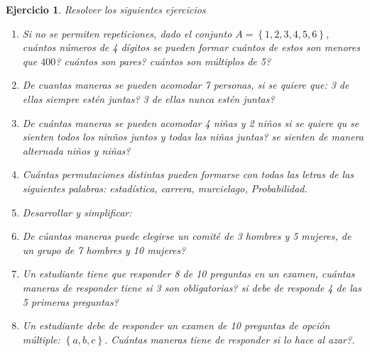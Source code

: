 \documentclass[12pt,twoside]{article}
\newtheorem{Ejer}{Ejercicio}
\begin{document}
\begin{Ejer} Resolver los siguientes ejercicios

\begin{enumerate}
\item Si no se permiten repeticiones, dado el conjunto $A=\left\{1,2,3,4,5,6\right\}$, cu\'antos n\'umeros de 4 d\'igitos se pueden formar cu\'antos de estos son menores que $400$? cu\'antos son pares? cu\'antos son m\'ultiplos de 5?


\item De cuantas maneras se pueden acomodar 7 personas, si se quiere que:  3 de ellas siempre est\'en juntas?  3 de ellas nunca est\'en juntas?

\item De cu\'antas maneras se pueden acomodar 4 ni\~nas y 2 ni\~nos si se quiere qu se sienten todos los nin\~nos juntos y todas las ni\~nas juntas? se sienten de manera alternada ni\~nos y ni\~nas?


\item Cu\'antas permutaciones distintas pueden formarse con todas las letras de las siguientes palabras: estad\'istica, carrera,  murcielago, Probabilidad.


\item Desarrollar y simplificar:

\begin{itemize}
\end{itemize}

\item De c\'uantas maneras puede elegirse un comit\'e de 3 hombres y 5 mujeres, de un grupo de 7 hombres y 10 mujeres?

\item Un estudiante tiene que responder 8 de 10 preguntas en un examen, cu\'antas maneras de responder tiene si 3 son obligatorias? si debe de responde 4 de las 5 primeras preguntas?


\item Un estudiante debe de responder un examen de 10 preguntas de opci\'on m\'ultiple: $\left\{a,b,c\right\}$. Cu\'antas maneras tiene de responder si lo hace al azar?. 



\end{enumerate}
\end{Ejer}
\end{document}
